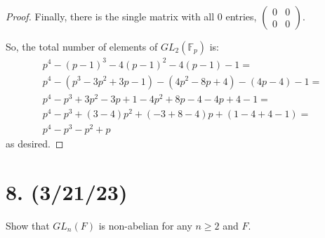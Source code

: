 \documentclass{article}
\begin{document}
\begin{proof}
    Finally, there is the single matrix with all 0 entries, $\begin{pmatrix}0 & 0\\0 & 0\end{pmatrix}$.

    So, the total number of elements of $GL_2(\mathbb{F}_p)$ is:
    \begin{multline*}
        p^4 - (p - 1)^3 - 4(p - 1)^2 - 4(p - 1) - 1 = \\
        p^4 - (p^3 - 3p^2 + 3p - 1) - (4p^2 - 8p + 4) - (4p - 4) - 1 = \\
        p^4 - p^3 + 3p^2 - 3p + 1 - 4p^2 + 8p - 4 - 4p + 4 - 1 = \\
        p^4 - p^3 + (3 - 4)p^2 + (-3 + 8 - 4)p + (1 - 4 + 4 - 1) = \\
        p^4 - p^3 - p^2 + p
    \end{multline*}
    as desired.
\end{proof}

\section*{8. (3/21/23)}

Show that $GL_n(F)$ is non-abelian for any $n \geq 2$ and $F$.
\end{document}
